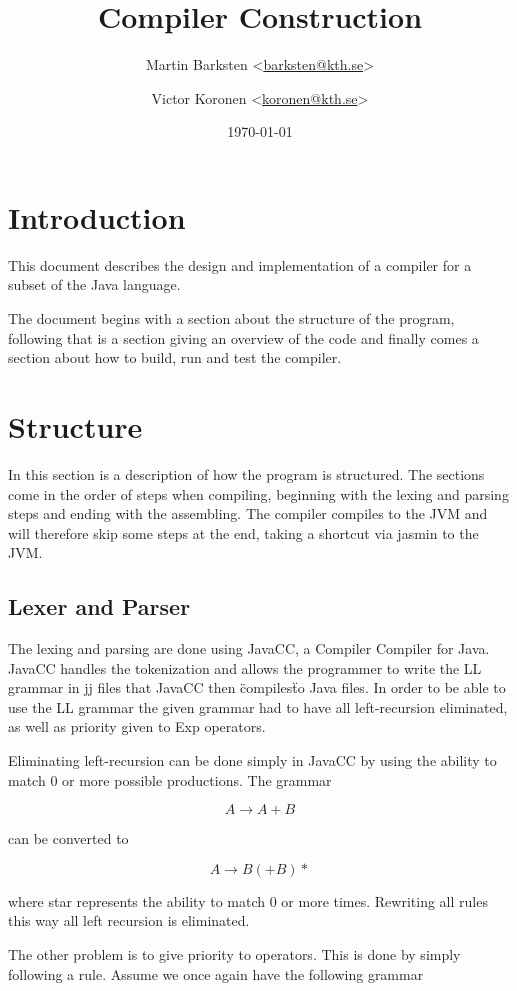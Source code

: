 \documentclass[a4paper]{article}
\title{Compiler Construction}
\author{%
    Martin Barksten <\href{mailto:barksten@kth.se}{barksten@kth.se}> \and
    Victor Koronen <\href{mailto:koronen@kth.se}{koronen@kth.se}>
}
\date{\today}
\begin{document}
\maketitle
\thispagestyle{empty}

\section{Introduction}
This document describes the design and implementation of a compiler for a subset of the Java language.

The document begins with a section about the structure of the program, following that is a section giving an overview of the code and finally comes a section about how to build, run and test the compiler.

\section{Structure}
In this section is a description of how the program is structured. The sections come in the order of steps when compiling, beginning with the lexing and parsing steps and ending with the assembling. The compiler compiles to the JVM and will therefore skip some steps at the end, taking a shortcut via jasmin to the JVM.

\subsection{Lexer and Parser}
The lexing and parsing are done using JavaCC, a Compiler Compiler for Java. JavaCC handles the tokenization and allows the programmer to write the LL grammar in jj files that JavaCC then \"compiles\" to Java files. In order to be able to use the LL grammar the given grammar had to have all left-recursion eliminated, as well as priority given to Exp operators.

Eliminating left-recursion can be done simply in JavaCC by using the ability to match $0$ or more possible productions. The grammar

$$A \rightarrow A + B$$

can be converted to

$$A \rightarrow B (+ B)*$$

where star represents the ability to match $0$ or more times. Rewriting all rules this way all left recursion is eliminated.

The other problem is to give priority to operators. This is done by simply following a rule. Assume we once again have the following grammar
\end{document}

